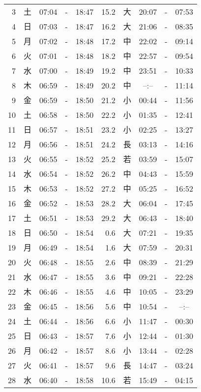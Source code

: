 \documentclass[a4j,10pt]{jsarticle}
\begin{document}
\begin{center}
\begin{table}[ht]
\begin{center}
\begin{tabular}{|rc|ccc|rc|ccc|}
  3 & 土 & 07:04 &-& 18:47 & 15.2 & 大 & 20:07 &-& 07:53 \\
  4 & 日 & 07:03 &-& 18:47 & 16.2 & 大 & 21:06 &-& 08:35 \\
  5 & 月 & 07:02 &-& 18:48 & 17.2 & 中 & 22:02 &-& 09:14 \\
  6 & 火 & 07:01 &-& 18:48 & 18.2 & 中 & 22:57 &-& 09:54 \\
  7 & 水 & 07:00 &-& 18:49 & 19.2 & 中 & 23:51 &-& 10:33 \\
  8 & 木 & 06:59 &-& 18:49 & 20.2 & 中 & --:-- &-& 11:14 \\
  9 & 金 & 06:59 &-& 18:50 & 21.2 & 小 & 00:44 &-& 11:56 \\
 10 & 土 & 06:58 &-& 18:50 & 22.2 & 小 & 01:35 &-& 12:41 \\
 11 & 日 & 06:57 &-& 18:51 & 23.2 & 小 & 02:25 &-& 13:27 \\
 12 & 月 & 06:56 &-& 18:51 & 24.2 & 長 & 03:13 &-& 14:16 \\
 13 & 火 & 06:55 &-& 18:52 & 25.2 & 若 & 03:59 &-& 15:07 \\
 14 & 水 & 06:54 &-& 18:52 & 26.2 & 中 & 04:43 &-& 15:59 \\
 15 & 木 & 06:53 &-& 18:52 & 27.2 & 中 & 05:25 &-& 16:52 \\
 16 & 金 & 06:52 &-& 18:53 & 28.2 & 大 & 06:04 &-& 17:45 \\
 17 & 土 & 06:51 &-& 18:53 & 29.2 & 大 & 06:43 &-& 18:40 \\
 18 & 日 & 06:50 &-& 18:54 &  0.6 & 大 & 07:21 &-& 19:35 \\
 19 & 月 & 06:49 &-& 18:54 &  1.6 & 大 & 07:59 &-& 20:31 \\
 20 & 火 & 06:48 &-& 18:55 &  2.6 & 中 & 08:39 &-& 21:29 \\
 21 & 水 & 06:47 &-& 18:55 &  3.6 & 中 & 09:21 &-& 22:28 \\
 22 & 木 & 06:46 &-& 18:55 &  4.6 & 中 & 10:05 &-& 23:29 \\
 23 & 金 & 06:45 &-& 18:56 &  5.6 & 中 & 10:54 &-& --:-- \\
 24 & 土 & 06:44 &-& 18:56 &  6.6 & 小 & 11:47 &-& 00:30 \\
 25 & 日 & 06:43 &-& 18:57 &  7.6 & 小 & 12:44 &-& 01:30 \\
 26 & 月 & 06:42 &-& 18:57 &  8.6 & 小 & 13:44 &-& 02:28 \\
 27 & 火 & 06:41 &-& 18:57 &  9.6 & 長 & 14:47 &-& 03:24 \\
 28 & 水 & 06:40 &-& 18:58 & 10.6 & 若 & 15:49 &-& 04:15 \\

\end{tabular}
\end{center}
\end{table}
\end{center}
\end{document}
